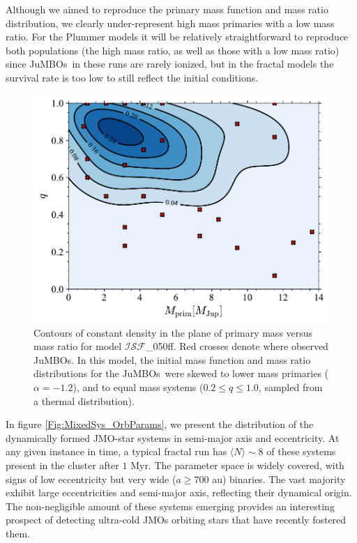 \documentclass[submission,phys]{lib/SciPost}
\newcommand{\jumbos}{\mbox{JuMBOs}}
\begin{document}
Although we aimed to reproduce the primary mass function and mass
ratio distribution, we clearly under-represent high mass primaries
with a low mass ratio. For the Plummer models it will be relatively
straightforward to reproduce both populations (the high mass ratio, as
well as those with a low mass ratio) since \jumbos\, in these runs are
rarely ionized, but in the fractal models the survival rate is too low
to still reflect the initial conditions.

   \begin{figure}
    \centering
    \includegraphics[width=0.75\columnwidth]{figures/Fractal_rvir0.5_Obs_mass_distr.pdf}
    \caption{Contours of constant density in the plane of primary mass
      versus mass ratio for model $\mathcal{ISF}$\_050ff. Red crosses
      denote where observed \jumbos.  In this model, the initial mass
      function and mass ratio distributions for the \jumbos\, were
      skewed to lower mass primaries ($\alpha = -1.2$), and to equal
      mass systems ($0.2\leq q\leq 1.0$, sampled from a thermal
      distribution).  }
         \label{Fig:FractalObs_mdistr}
   \end{figure}

In figure \ref{Fig:MixedSys_OrbParams}, we present the distribution of
the dynamically formed JMO-star systems in semi-major axis and eccentricity.
At any given instance in time, a typical fractal run has $\langle N\rangle \sim 
8$ of these systems present in the cluster after $1$ Myr. The parameter space
is widely covered, with signs of low eccentricity but very wide
($a\geq700$ au) binaries. The vast majority exhibit
large eccentricities and semi-major axis, reflecting their dynamical
origin. The non-negligible amount of these systems emerging provides an
interesting prospect of detecting ultra-cold JMOs orbiting stars
that have recently fostered them.
\end{document}
